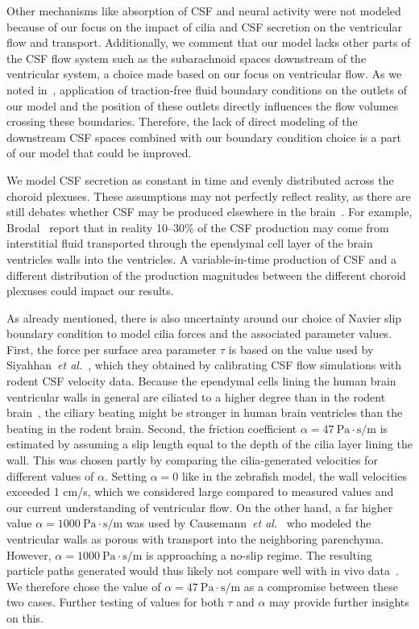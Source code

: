 \documentclass{template}
\begin{document}
Other mechanisms like absorption of CSF and neural activity were not modeled because 
of our focus on the impact of cilia and CSF secretion on the ventricular flow and transport.
Additionally, we comment that our model lacks other parts of the CSF flow system such
as the subarachnoid spaces downstream of the ventricular system, a choice made based on our focus on ventricular flow.
As we noted in~, application of traction-free fluid boundary conditions on the outlets of our model
and the position of these outlets directly influences the flow volumes crossing these boundaries.
Therefore, the lack of direct modeling of the downstream CSF spaces
combined with our boundary condition choice is a part of our model that could be improved.

We model CSF secretion as constant in time and evenly distributed
across the choroid plexuses. These assumptions may not perfectly reflect
reality, as there are still debates whether CSF may be produced
elsewhere in the brain~\citep{miyajima2015evaluation}.
For example, Brodal~\citep{Brodal2016TheSystem}
report that in reality 10--30\% of the CSF production
may come from interstitial fluid transported through the ependymal cell
layer of the brain ventricles walls into the ventricles.
A variable-in-time production of CSF and a different distribution of the production
magnitudes between the different choroid plexuses could impact our results. 

As already mentioned, there is also uncertainty around our choice
of Navier slip boundary condition to model cilia forces and the associated parameter values.
First, the force per surface area parameter $\tau$ is based on the value used by
Siyahhan~\emph{et al.}~\citep{Siyahhan2014FlowVentricles}, which they obtained by
calibrating CSF flow simulations with rodent CSF velocity data. Because the
ependymal cells lining the human brain ventricular walls
in general are ciliated to a higher degree than in the rodent brain~\citep{spassky2017development},
the ciliary beating might be stronger in human brain ventricles
than the beating in the rodent brain. Second,
the friction coefficient $\alpha=47 \ \mathrm{Pa\cdot s/m}$
is estimated by assuming a slip length equal to the depth of the cilia layer lining
the wall. This was chosen partly by comparing the cilia-generated velocities for
different values of $\alpha$. Setting $\alpha=0$ like in the zebrafish model,
the wall velocities exceeded 1 cm/s, which we considered large compared to measured
values and our current understanding of ventricular flow.
On the other hand, a far higher value $\alpha=1000 \ \mathrm{Pa\cdot s/m}$
was used by Causemann~\emph{et al.}~\citep{Causemann2022HumanFramework}
who modeled the ventricular walls as porous with transport into the neighboring
parenchyma. However, $\alpha=1000 \ \mathrm{Pa\cdot s/m}$
is approaching a no-slip regime. The resulting
particle paths generated would thus likely not compare well with
in vivo data~\citep{stadlbauer2010insight}. We therefore
chose the value of $\alpha=47 \ \mathrm{Pa\cdot s/m}$ as a 
compromise between these two cases. Further testing of values for
both $\tau$ and $\alpha$ may provide further insights on this.
\end{document}
